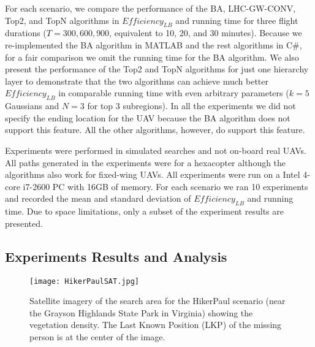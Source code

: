 For each scenario, we compare the performance of the BA, LHC-GW-CONV, Top2, and TopN algorithms in $\mathit{Efficiency_{LB}}$ and running time for three flight durations ($T=300,600,900$, equivalent to 10, 20, and 30 minutes). Because we re-implemented the BA algorithm in MATLAB and the rest algorithms in C\#, for a fair comparison we omit the running time for the BA algorithm. We also present the performance of the Top2 and TopN algorithms for just one hierarchy layer to demonstrate that the two algorithms can achieve much better $\mathit{Efficiency_{LB}}$ in comparable running time with even arbitrary parameters ($k=5$ Gaussians and $N=3$ for top 3 subregions). In all the experiments we did not specify the ending location for the UAV because the BA algorithm does not support this feature. All the other algorithms, however, do support this feature.

Experiments were performed in simulated searches and not on-board real UAVs. All paths generated in the experiments were for a hexacopter although the algorithms also work for fixed-wing UAVs. All experiments were run on a Intel 4-core i7-2600 PC with 16GB of memory. For each scenario we ran 10 experiments and recorded the mean and standard deviation of $\mathit{Efficiency_{LB}}$ and running time. Due to space limitations, only a subset of the experiment results are presented.

\subsection{Experiments Results and Analysis}

\begin{figure}
\centering
\texttt{[image: HikerPaulSAT.jpg]}
\caption[Satellite imagery of the search area for the HikerPaul scenario]{Satellite imagery of the search area for the HikerPaul scenario (near the Grayson Highlands State Park in Virginia) showing the vegetation density. The Last Known Position (LKP) of the missing person is at the center of the image.}
\label{HikerPaulSAT}
\end{figure}

